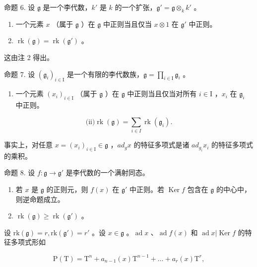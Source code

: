 命题 6. 设 \(\mathfrak{g}\) 是一个李代数，\(k'\) 是 \(k\) 的一个扩张，\(\mathfrak{g}' = \mathfrak{g} \otimes_k k'\) 。

\begin{enumerate}
\def\labelenumi{(\roman{enumi})}
\tightlist
\item
  一个元素 \(x\) （属于 \(\mathfrak{g}\) ）在 \(\mathfrak{g}\) 中正则当且仅当 \(x \otimes 1\) 在 \(\mathfrak{g}'\) 中正则。\\
\item
  \(\operatorname{rk}(\mathfrak{g}) = \operatorname{rk}(\mathfrak{g}')\) 。
\end{enumerate}

这由注 2 得出。

命题 7. 设 \((\mathfrak{g}_i)_{i\in \mathrm{I}}\) 是一个有限的李代数族，\(\mathfrak{g} = \prod_{i\in \mathrm{I}}\mathfrak{g}_i\) 。

\begin{enumerate}
\def\labelenumi{(\roman{enumi})}
\tightlist
\item
  一个元素 \((x_{i})_{i\in \mathrm{I}}\) （属于 \(\mathfrak{g}\) ）在 \(\mathfrak{g}\) 中正则当且仅当对所有 \(i\in \mathrm{I}\) ，\(x_{i}\) 在 \(\mathfrak{g}_i\) 中正则。
\end{enumerate}

\[
\text {(ii)} \operatorname{rk} (\mathfrak {g}) = \sum_ {i \in I} \operatorname{rk} (\mathfrak {g} _ {i}).
\]

事实上，对任意 \(x = (x_{i})_{i \in \mathrm{I}} \in \mathfrak{g}\) ，\(ad_{g}x\) 的特征多项式是诸 \(ad_{g_{i}}x_{i}\) 的特征多项式的乘积。

命题 8. 设 \(f: \mathfrak{g} \to \mathfrak{g}'\) 是李代数的一个满射同态。

\begin{enumerate}
\def\labelenumi{(\roman{enumi})}
\item
  若 \(x\) 是 \(\mathfrak{g}\) 的正则元，则 \(f(x)\) 在 \(\mathfrak{g}'\) 中正则。若 \(\operatorname{Ker} f\) 包含在 \(\mathfrak{g}\) 的中心中，则逆命题成立。
\item
  \(\operatorname{rk}(\mathfrak{g}) \geq \operatorname{rk}(\mathfrak{g}')\) 。
\end{enumerate}

设 \(\mathrm{rk}(\mathfrak{g}) = r, \mathrm{rk}(\mathfrak{g}') = r'\) 。设 \(x \in \mathfrak{g}\) 。\(\operatorname{ad} x\) 、\(\operatorname{ad} f(x)\) 和 \(\operatorname{ad} x|\operatorname{Ker} f\) 的特征多项式形如

\[
\mathrm{P} (\mathrm{T}) = \mathrm{T} ^ {n} + a _ {n - 1} (x) \mathrm{T} ^ {n - 1} + \dots + a _ {r} (x) \mathrm{T} ^ {r},
\]

